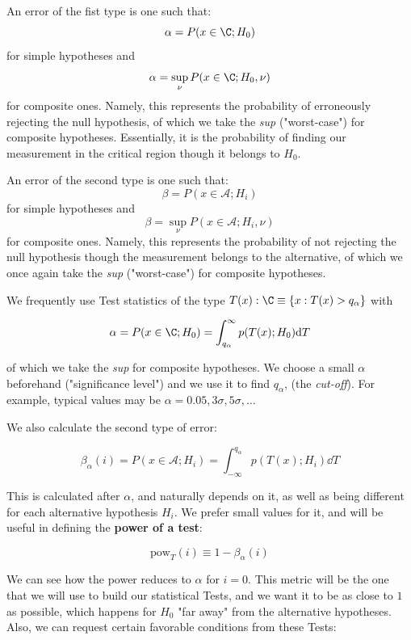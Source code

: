 \begin{definition}
	An error of the fist type is one such that:
	\[
	\alpha = P(x\in \C;H_0)
	\]
	for simple hypotheses and 
	\[
	\alpha =\sup_\nu P(x\in \C;H_0,\nu)
	\]
	for composite ones. 
	Namely, this represents the probability of erroneously rejecting the null hypothesis, of which we take the \emph{sup} ("worst-case") for composite hypotheses. Essentially, it is the probability of finding our measurement in the critical region though it belongs to $H_0$.
\end{definition}

\begin{definition}
	An error of the second type is one such that:
	\[
	\beta = P(x\in \mathcal{A};H_i)
	\]
	for simple hypotheses and 
	\[
	\beta =\sup_\nu P(x\in \mathcal{A};H_i,\nu)
	\]
	for composite ones. 
	Namely, this represents the probability of not rejecting the null hypothesis though the measurement belongs to the alternative, of which we once again take the \emph{sup} ("worst-case") for composite hypotheses. 
\end{definition}


We frequently use Test statistics of the type $T(x):\C\equiv\{x:T(x)>q_\alpha\}$ with
	
	\[
	\alpha = P(x\in \C;H_0) = \int_{q_\alpha}^{\infty}p(T(x);H_0)\dd T
	\]

of which we take the \emph{sup} for composite hypotheses. We choose a small $\alpha$ beforehand ("significance level") and we use it to find $q_\alpha$, (the \emph{cut-off}). For example, typical values may be $\alpha = 0.05, 3\sigma, 5\sigma,\dots$

We also calculate the second type of error:

	\[
	\beta_\alpha(i) = P(x\in \mathcal{A};H_i) = \int_{-\infty}^{q_\alpha}p(T(x);H_i)\dd T
	\]

This is calculated after $\alpha$, and naturally depends on it, as well as being different for each alternative hypothesis $H_i$. We prefer small values for it, and will be useful in defining the \textbf{power of a test}: 

	\[
	\text{pow}_T(i) \equiv 1- \beta_\alpha(i)
	\tag{Power of a Test}
	\]

We can see how the power reduces to $\alpha$ for $i=0$. This metric will be the one that we will use to build our statistical Tests, and we want it to be as close to $1$ as possible, which happens for $H_0$ "far away" from the alternative hypotheses. Also, we can request certain favorable conditions from these Tests:

